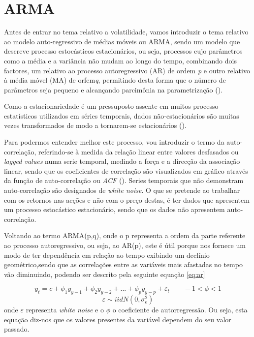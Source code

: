 \documentclass[
  12pt,
  a4paper,
  openany]{book}
\begin{document}
\hypertarget{arma}{%
\section{ARMA}\label{arma}}

Antes de entrar no tema relativo a volatilidade, vamos introduzir o tema relativo ao modelo auto-regressivo de médias móveis ou ARMA, sendo um modelo que descreve processo estocásticos estacionários, ou seja, processos cujo parâmetros como a média e a variância não mudam ao longo do tempo, combinando dois factores, um relativo ao processo autoregressivo (AR) de ordem \emph{p} e outro relativo à média móvel (MA) de orfem\emph{q}, permitindo desta forma que o número de parâmetros seja pequeno e alcançando parcimônia na parametrização (\citet{parcimonia}).

Como a estacionariedade é um pressuposto assente em muitos processo estatísticos utilizados em séries temporais, dados não-estacionários são muitas vezes transformados de modo a tornarem-se estacionários (\citet{stwiki}).

Para podermos entender melhor este processo, vou introduzir o termo da auto-correlação, referindo-se à medida da relação linear entre valores desfasados ou \emph{lagged values} numa serie temporal, medindo a força e a direcção da associação linear, sendo que os coeficientes de correlação são visualizados em gráfico através da função de auto-correlação ou \emph{ACF} (\citet{foregeorge}). Series temporais que não demonstram auto-correlação são designados de \emph{white noise}. O que se pretende ao trabalhar com os retornos nas acções e não com o preço destas, é ter dados que apresentem um processo estocástico estacionário, sendo que os dados não apresentem auto-correlação.

Voltando ao termo ARMA(p,q), onde o p representa a ordem da parte referente ao processo autoregressivo, ou seja, ao AR(p), este é útil porque nos fornece um modo de ter dependência em relação ao tempo exibindo um declínio geométrico,sendo que as correlações entre as variáveis mais afastadas no tempo vão diminuindo, podendo ser descrito pela seguinte equação \eqref{eq:ar}

\begin{equation} 
  y_t =c+\phi_1y_{y-1}+\phi_2y_{y-2}+...+\phi_py_{y-p}+\varepsilon_t\qquad   -1<\phi<1
  \label{eq:ar}
\end{equation}
\begin{equation} 
  \nonumber \varepsilon \sim iid N(0,\sigma_{\epsilon}^{2})
\end{equation}
onde \(\varepsilon\) representa \emph{white noise} e o \(\phi\) o coeficiente de autorregressão. Ou seja, esta equação diz-nos que os valores presentes da variável dependem do seu valor passado.
\end{document}
